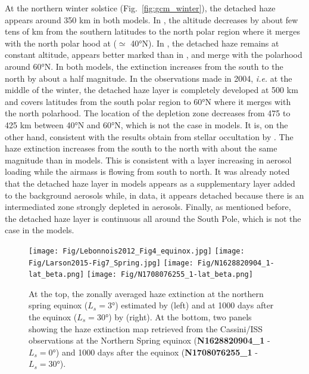 At the northern winter solstice (Fig.~\ref{fig:gcm_winter}), the detached haze appears around 350 km
in both models. In \cite{Lebonnois2012}, the altitude decreases by about few tens of km from the southern latitudes to
the north polar region where it merges with the north polar hood at ($\simeq$ \ang{40}N). In \cite{Larson2015}, the detached
haze remains at constant altitude, appears better marked than in \cite{Lebonnois2012}, and merge with the polarhood
around \ang{60}N. In both models, the extinction increases from the south to the north by about a half magnitude.
In the observations made in 2004, \emph{i.e.} at the middle of the winter, the detached haze layer is completely developed at
500 km and covers latitudes from the south polar region to \ang{60}N where it merges with the north polarhood. The
location of the depletion zone decreases from 475 to 425 km between \ang{40}N and \ang{60}N, which is not the case in
models. It is, on the other hand, consistent with the results obtain from stellar occultation by \cite{Sicardy2006}.
The haze extinction increases from the south to the north with about the same magnitude than in models. This
is consistent with a layer increasing in aerosol loading while the airmass is flowing from south to north. It was already
noted \citep{West2011, West2018} that the detached haze layer in models appears as a supplementary layer added to
the background aerosols while, in data, it appears detached because there is an intermediated zone strongly depleted in
aerosols. Finally, as mentioned before, the detached haze layer is continuous all around the South Pole, which is not
the case in the models.

\begin{figure}[!ht]
    \centering
    \texttt{[image: Fig/Lebonnois2012\_Fig4\_equinox.jpg]}
    \texttt{[image: Fig/Larson2015-Fig7\_Spring.jpg]}
    \texttt{[image: Fig/N1628820904\_1-lat\_beta.png]}
    \texttt{[image: Fig/N1708076255\_1-lat\_beta.png]}
    \caption{At the top, the zonally averaged haze extinction at the northern spring equinox ($L_s = \ang{3}$)
        estimated by \cite{Lebonnois2012} (left) and at 1000 days after the equinox ($L_s = \ang{30}$)
        by \cite{Larson2015} (right).
        At the bottom, two panels showing the haze extinction map retrieved from the Cassini/ISS observations
        at the Northern Spring equinox (\textbf{N1628820904\_1} - $L_s = \ang{0}$) and 1000 days after the equinox
        (\textbf{N1708076255\_1} - $L_s = \ang{30}$).}
    \label{fig:gcm_spring}
\end{figure}

